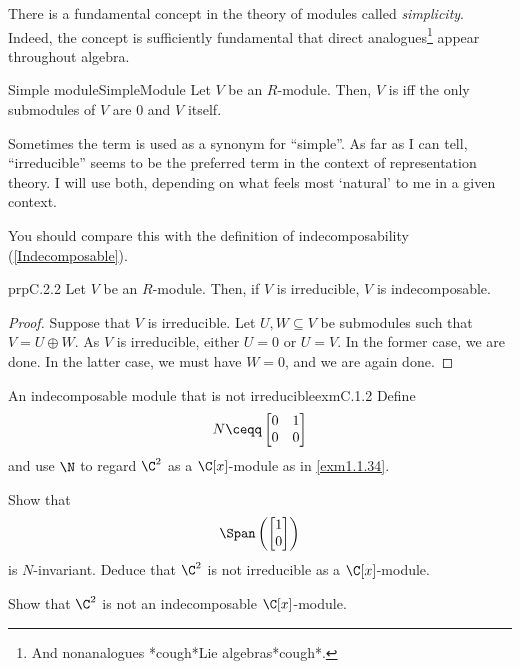 There is a fundamental concept in the theory of modules called \emph{simplicity}.  Indeed, the concept is sufficiently fundamental that direct analogues\footnote{And nonanalogues *cough*Lie algebras*cough*.} appear throughout algebra.
\begin{dfn}{Simple module}{SimpleModule}
	Let $V$ be an $R$-module.  Then, $V$ is  iff the only submodules of $V$ are $0$ and $V$ itself.
	\begin{rmk}
		Sometimes the term  is used as a synonym for ``simple''.  As far as I can tell, ``irreducible'' seems to be the preferred term in the context of representation theory.  I will use both, depending on what feels most `natural' to me in a given context.
	\end{rmk}
	\begin{rmk}
		You should compare this with the definition of indecomposability (\cref{Indecomposable}).
	\end{rmk}
\end{dfn}
\begin{prp}{}{prpC.2.2}
	Let $V$ be an $R$-module.  Then, if $V$ is irreducible, $V$ is indecomposable.
	\begin{proof}
		Suppose that $V$ is irreducible.  Let $U,W\subseteq V$ be submodules such that $V=U\oplus W$.  As $V$ is irreducible, either $U=0$ or $U=V$.  In the former case, we are done.  In the latter case, we must have $W=0$, and we are again done.
	\end{proof}
\end{prp}
\begin{exm}{An indecomposable module that is not irreducible}{exmC.1.2}
	Define
	\begin{equation}
		N\ceqq \begin{bmatrix}0 & 1 \\ 0 & 0\end{bmatrix}
	\end{equation}
	and use $\N$ to regard $\C ^2$ as a $\C [x]$-module as in \cref{exm1.1.34}.
	
	\begin{exr}[breakable=false]{}{}
		Show that
		\begin{equation}
			\Span \left( \begin{bmatrix}1 \\ 0\end{bmatrix}\right) 
		\end{equation}
		is $N$-invariant.  Deduce that $\C ^2$ is not irreducible as a $\C [x]$-module.
	\end{exr}
	\begin{exr}[breakable=false]{}{}
		Show that $\C ^2$ is not an indecomposable $\C [x]$-module.
	\end{exr}
\end{exm}

